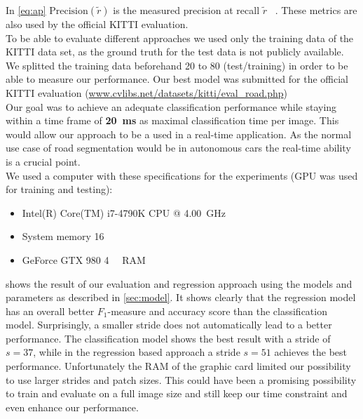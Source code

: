 %
In \cref{eq:ap}  $\text{Precision}(\tilde{r})$ is the measured precision at recall $\tilde{r}$ ~\cite{everingham2010pascal}. These metrics are also used by the official KITTI evaluation. \\
To be able to evaluate different approaches we used only the
training data of the KITTI data set, as the ground truth for the test data is
not publicly available. We splitted the training data beforehand 20 to 80
(test/training) in order to be able to measure our performance. Our best model
was submitted for the official KITTI evaluation
(\href{http://www.cvlibs.net/datasets/kitti/eval_road.php}{www.cvlibs.net/datasets/kitti/eval\_road.php})\\

Our goal was to achieve an adequate classification performance while staying
within a time frame of \textbf{\SI{20}{\milli\second}} as maximal
classification time per image. This would allow our approach to be a used in a real-time application.
As the normal use case of road segmentation would be in autonomous cars the real-time ability is a crucial point.\\

We used a computer with these specifications for the experiments (GPU was used
for training and testing):
\begin{itemize}
    \item Intel(R) Core(TM) i7-4790K CPU @ \SI{4.00}{\giga\hertz}
    \item System memory \SI{16}{\gibi\byte}
    \item GeForce GTX 980 \SI{4}{\gibi\byte} RAM
\end{itemize}

 shows the result of our evaluation and regression
approach using the models and parameters as described in \cref{sec:model}.
It shows clearly that the regression model has an
overall better $F_1$-measure and accuracy score than the classification model.
Surprisingly, a smaller stride does not automatically lead to a better
performance. The classification model shows  the best result with a stride of $s=37$,
while in the regression based approach a stride $s=51$ achieves the
best performance. Unfortunately the RAM of the graphic card limited our
possibility to use larger strides and patch sizes. This could have been a
promising possibility to train and evaluate on a full image size and still keep
our time constraint and even enhance our performance.\\

